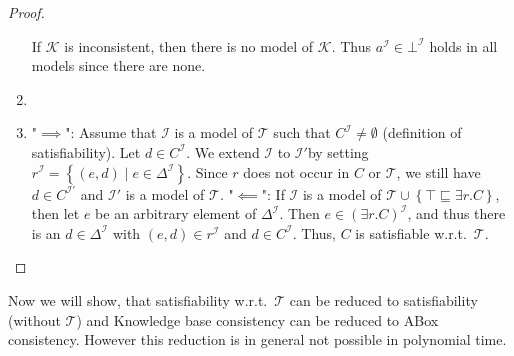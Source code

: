 \begin{proof}
\begin{enumerate}
			If $\mathcal{K}$ is inconsistent, then there is no model of $\mathcal{K}$.
			Thus $a^{\mathcal{I}} \in \bot^\mathcal{I}$ holds in all models since there are none.
		\item
		\item "$ \implies$": \newline
			Assume that $\mathcal{I}$ is a model of $\mathcal{T}$ such that $C^\mathcal{I} \neq \emptyset$
			(definition of satisfiability).
			Let $d \in C^{\mathcal{I}}$.
			We extend $\mathcal{I}$ to $\mathcal{I}'$by setting $r^{\mathcal{I}} = \left\{ (e,d) \mid  e \in \Delta^{\mathcal{I}} \right\}$.
			Since $r$ does not occur in $C$ or $\mathcal{T}$, we still have $d \in C^\mathcal{I'}$ and $\mathcal{I'}$ is a model of $\mathcal{T}$. \newline
			"$\impliedby$": \newline
			If $\mathcal{I}$ is a model of $\mathcal{T} \cup \left\{ \top \sqsubseteq \exists r.C \right\}$,
			then let $e$ be an arbitrary element of $\Delta^{\mathcal{I}}$.
			Then $e \in \left( \exists r.C \right)^{\mathcal{I}}$, and thus there is an $d \in \Delta^{\mathcal{I}}$ 
			with $\left( e,d \right) \in r^{\mathcal{I}}$ and $d \in C^\mathcal{I}$.
			Thus, $C$ is satisfiable w.r.t.\ $\mathcal{T}$.
			\qedhere
	\end{enumerate}
\end{proof}

Now we will show, that satisfiability w.r.t.\ $\mathcal{T}$ can be reduced to satisfiability (without $\mathcal{T}$) and
Knowledge base consistency can be reduced to ABox consistency.
However this reduction is in general not possible in polynomial time.


